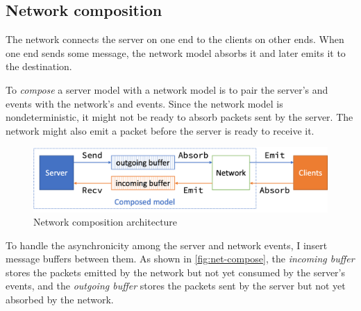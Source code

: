 \subsection{Network composition}
\label{sec:net-compose}

The network connects the server on one end to the clients on other ends.  When
one end sends some message, the network model absorbs it and later emits it to
the destination.

To {\em compose} a server model with a network model is to pair the server's
 and  events with the network's  and 
events.  Since the network model is nondeterministic, it might not be ready to
absorb packets sent by the server.  The network might also emit a packet before
the server is ready to receive it.

\begin{figure}
  \includegraphics[width=\textwidth]{figures/net-compose}
  \caption{Network composition architecture}
  \label{fig:net-compose}
\end{figure}

To handle the asynchronicity among the server and network events, I insert
message buffers between them.  As shown in \autoref{fig:net-compose}, the {\em
  incoming buffer} stores the packets emitted by the network but not yet
consumed by the server's  events, and the {\em outgoing buffer} stores
the packets sent by the server but not yet absorbed by the network.

